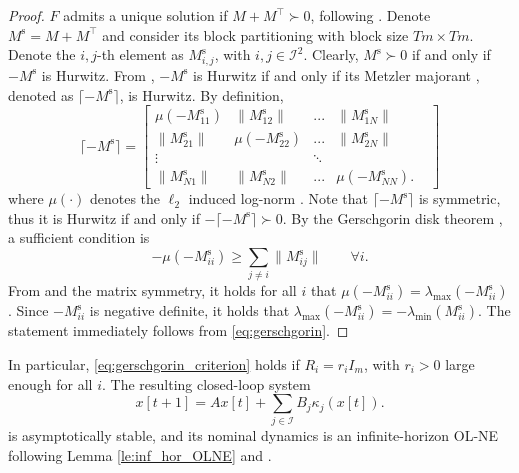 \documentclass[letterpaper, 10 pt, conference]{ieeeconf}  %
\newcommand{\edit}[1]{\textcolor{blue}{#1}}
\newcommand{\mc}{\mathcal}
\newcommand{\Ms}{M^{\mathrm{s}}}
\begin{document}
\begin{proof}
$F$ admits a unique solution if $M+M^{\top}\succ 0$, following \cite[Proposition 2.3.2]{facchinei_finite-dimensional_2007}. Denote $\Ms = M + M^{\top}$ and consider its block partitioning with block size $Tm\times Tm$. Denote the $i,j$-th element as $\Ms_{i,j}$, with $i,j\in\mc I^2$. Clearly, $\Ms\succ 0$ if and only if $-\Ms$ is Hurwitz. From \cite[Corollary 2.34]{bullo_contraction_2024}, $-\Ms$ is Hurwitz if and only if its Metzler majorant \cite[\S 2.2]{bullo_contraction_2024}, denoted as $\lceil -\Ms \rceil$, is Hurwitz. By definition, 
\begin{equation}
    \lceil -\Ms \rceil = \begin{bmatrix} \mu(-\Ms_{11}) & \|\Ms_{12}\| & ... & \|\Ms_{1N}\| \\
        \|\Ms_{21}\| & \mu(-\Ms_{22}) & ... & \|\Ms_{2N}\| \\
        \vdots &  & \ddots & & \\
        \|\Ms_{N1}\| & \|\Ms_{N2}\| & ... & \mu(-\Ms_{NN}).
    \end{bmatrix}
\end{equation}
where $\mu(\cdot)$ denotes the $\ell_2$ induced log-norm \cite[Eq. 2.23]{bullo_contraction_2024}. Note that $\lceil -\Ms \rceil$ is symmetric, thus it is Hurwitz if and only if $-\lceil -\Ms \rceil\succ 0$. By the Gerschgorin disk theorem \cite[Theorem 2.8]{bullo_lectures_2024}, a sufficient condition is
\begin{equation} \label{eq:gerschgorin}
	-\mu(-\Ms_{ii}) \geq \sum_{j\neq i} \|\Ms_{ij}\| \qquad \forall i.
\end{equation}
From \cite[Example 2.25]{bullo_contraction_2024} and the matrix symmetry, it holds for all $i$ that $\mu(-\Ms_{ii}) = \lambda_{\text{max}}(-\Ms_{ii})$. Since $-\Ms_{ii}$ is negative definite, it holds that $\lambda_{\text{max}}(-\Ms_{ii}) = -\lambda_{\text{min}}(\Ms_{ii}) $. The statement immediately follows from \eqref{eq:gerschgorin}.
\end{proof}
In particular, \eqref{eq:gerschgorin_criterion} holds if $R_i=r_iI_m$, with $r_i>0$ large enough for all $i$. The resulting closed-loop system 
\begin{equation}\label{eq:closed_loop_dyn}
    x[t+1] = Ax[t] + \sum_{j\in\mc I} B_j \kappa_j(x[t]).
\end{equation}
is asymptotically stable, and its nominal dynamics is an infinite-horizon OL-NE following Lemma \ref{le:inf_hor_OLNE} and \cite[Lemma 2]{benenati2024linear}. 
\fi
\end{document}
